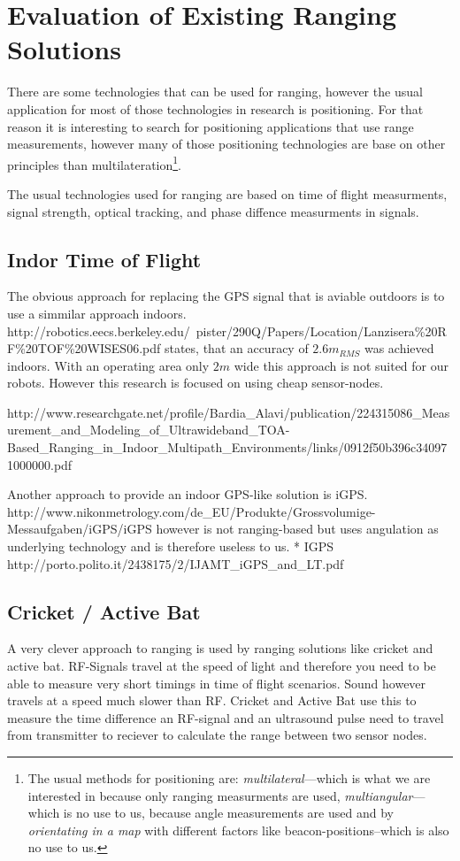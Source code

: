 \section{Evaluation of Existing Ranging Solutions}
There are some technologies that can be used for ranging, however the usual application for most of those technologies in research is positioning.
For that reason it is interesting to search for positioning applications that use range measurements, however many of those positioning technologies are base on other principles than multilateration\footnote{The usual methods for positioning are: \emph{multilateral}—which is what we are interested in because only ranging measurments are used, \emph{multiangular}—which is no use  to us, because angle measurements are used and by \emph{orientating in a map} with different factors like beacon-positions–which is also no use to us.}.
\cite{_multilateration_2015}

The usual technologies used for ranging are based on time of flight measurments, signal strength, optical tracking, and phase diffence measurments in signals.

\subsection{Indor Time of Flight}
The obvious approach for replacing the GPS signal that is aviable outdoors is to use a simmilar approach indoors.
http://robotics.eecs.berkeley.edu/~pister/290Q/Papers/Location/Lanzisera\%20RF\%20TOF\%20WISES06.pdf  states, that an accuracy of $2.6m_{RMS}$ was achieved indoors.
With an operating area only $2m$ wide this approach is not suited for our robots.
However this research is focused on using cheap sensor-nodes.

http://www.researchgate.net/profile/Bardia\_Alavi/publication/224315086\_Measurement\_and\_Modeling\_of\_Ultrawideband\_TOA-Based\_Ranging\_in\_Indoor\_Multipath\_Environments/links/0912f50b396c340971000000.pdf 

Another approach to provide an indoor GPS-like solution is iGPS. http://www.nikonmetrology.com/de\_EU/Produkte/Grossvolumige-Messaufgaben/iGPS/iGPS  however is not ranging-based but uses angulation as underlying technology and is therefore useless to us.
  * IGPS http://porto.polito.it/2438175/2/IJAMT\_iGPS\_and\_LT.pdf
\subsection{Cricket / Active Bat}
A very clever approach to ranging is used by ranging solutions like cricket and active bat. 
RF-Signals travel at the speed of light and therefore you need to be able to measure very short timings in time of flight scenarios.
Sound however travels at a speed much slower than RF.
Cricket and Active Bat use this to measure the time difference an RF-signal and an ultrasound pulse need to travel from transmitter to reciever to calculate the range between two sensor nodes. 

